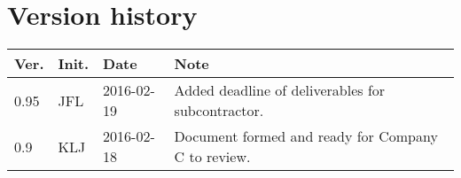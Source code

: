 \chapter*{Version history}
\label{app:rev_his}


\begin{tabular}{b{1cm} b{1cm} b{2cm} b{8cm}}
    \textbf{Ver.} & \textbf{Init.} & \textbf{Date} & \textbf{Note} \\
    \hline
    0.95 & JFL & 2016-02-19 & Added deadline of deliverables for subcontractor. \\
    0.9 & KLJ & 2016-02-18 & Document formed and ready for Company C to review. \\
\end{tabular}
